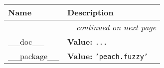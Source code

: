     \vspace{-1cm}
\hspace{\varindent}\begin{longtable}{|p{\varnamewidth}|p{\vardescrwidth}|l}
\cline{1-2}
\cline{1-2} \centering \textbf{Name} & \centering \textbf{Description}& \\
\cline{1-2}
\endhead\cline{1-2}\multicolumn{3}{r}{\small\textit{continued on next page}}\\\endfoot\cline{1-2}
\endlastfoot\raggedright \_\-\_\-d\-o\-c\-\_\-\_\- & \raggedright \textbf{Value:} 
{\tt \texttt{...}}&\\
\cline{1-2}
\raggedright \_\-\_\-p\-a\-c\-k\-a\-g\-e\-\_\-\_\- & \raggedright \textbf{Value:} 
{\tt \texttt{'}\texttt{peach.fuzzy}\texttt{'}}&\\
\cline{1-2}
\end{longtable}

